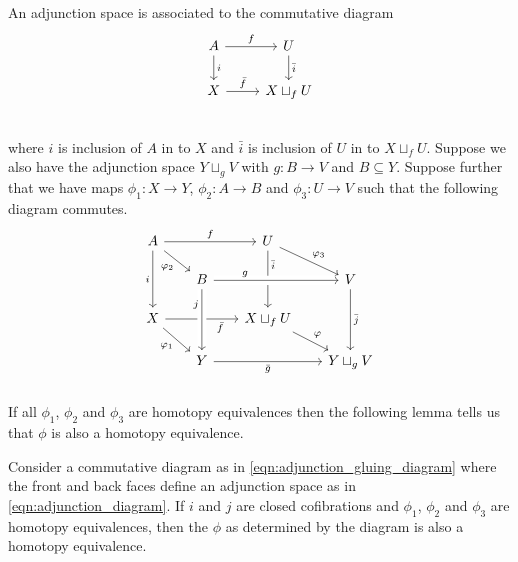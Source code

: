 \documentclass[class=article, crop=false]{standalone}
\begin{document}
An adjunction space is associated to the commutative diagram
\begin{equation}
    \begin{tikzcd}
            A \ar[r, "f" ] \ar[d, "i"]  &   U  \ar[d, "\bar{i}"]    \\
            X \ar[r, "\bar{f}"]         &   X \sqcup_f U            \\
    \end{tikzcd}
\label{eqn:adjunction_diagram}
\end{equation}
where $i$ is inclusion of $A$ in to $X$ and $\bar{i}$ is inclusion of $U$ in to $X \sqcup_f U $. Suppose we also have the adjunction space $Y \sqcup_g V$ with $g \colon B \to V$ and $B\subseteq Y$. Suppose further that we have maps $ \phi_1 \colon X \to Y$, $\phi_2 \colon A \to B$ and $\phi_3 \colon U \to V$ such that the following diagram commutes.
\begin{equation}
    \begin{tikzcd}[row sep=scriptsize, column sep=scriptsize]
A \ar[dr, "\phi_2"'] \ar[rr, "f"] \ar[dd, "i"']     &                                                                           &   U \ar[dr, "\phi_3"] \ar[dd, "\bar{i}", near start]  &                         \\
                                                &   B \ar[rr, crossing over, "g" near start]                                &                                                       &   V \ar[dd, "\bar{j}"]  \\
X \ar[dr, "\phi_1"'] \ar[rr, "\bar{f}"', near end]  &                                                                           &   X \sqcup_f U \ar[dr, "\phi"]                        &                         \\
                                                &   Y \ar[rr, "\bar{g}"']  \ar[from=uu, crossing over, "j"', near start]    &                                                       &   Y\sqcup_gV            \\
    \end{tikzcd}
\label{eqn:adjunction_gluing_diagram}
\end{equation}
If all $\phi_1$, $\phi_2$ and $\phi_3$ are homotopy equivalences then the following lemma tells us that $\phi$ is also a homotopy equivalence.


\begin{lemma}
    Consider a commutative diagram as in \eqref{eqn:adjunction_gluing_diagram} where the front and back faces define an adjunction space as in \eqref{eqn:adjunction_diagram}. If $i$ and $j$ are closed cofibrations and $\phi_1$, $\phi_2$ and $\phi_3$ are homotopy equivalences, then the $\phi$ as determined by the diagram is also a homotopy equivalence.
    \label{lem:adjunction_gluing}
\end{lemma}
\end{document}
